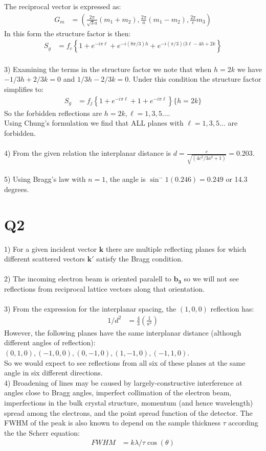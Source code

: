 \documentclass[a4paper,11pt]{article}
\numberwithin{equation}{section}
\newcommand{\bv}[1]{\mathbf{#1}}
\newcommand{\lrp}[1]{\left({#1}\right)}
\newcommand{\lrb}[1]{\left\{{#1}\right\}}
\begin{document}
The reciprocal vector is expressed as:
\begin{align}
 G_m &= \lrp{\frac{2\pi}{\sqrt{3}a}(m_1+m_2),\frac{2\pi}{a}(m_1-m_2), \frac{2\pi}{c}m_3}
\end{align}
In this form the structure factor is then:
\begin{align}
 S_g &= f_c\lrb{ 1 + e^{-i\pi\ell}+e^{-i(8\pi/3)h}+e^{-i(\pi/3)(3\ell-4h+2k} }
\end{align}
\\
3) Examining the terms in the structure factor we note that when $h=2k$ we have $-1/3h+2/3k=0$ and $1/3h-2/3k=0$.
Under this condition the structure factor simplifies to:
\begin{align}
 S_g &= f_j\lrb{ 1 + e^{-i\pi\ell}+1+e^{-i\pi\ell} }\{h=2k\}
\end{align}
So the forbidden reflections are $h=2k,\ell=1,3,5...$.
\\
Using Chung's formulation we find that ALL planes with $\ell=1,3,5...$ are forbidden.
\\ \\
4) From the given relation the interplanar distance is $d=\frac{c}{\sqrt{\lrp{4c^2/3a^2+1}}}=0.203$.
\\ \\
5) Using Bragg's law with $n=1$, the angle is $\sin^-1{(0.246)}=0.249$ or 14.3 degrees.
\section*{Q2}
1) For a given incident vector $\bv{k}$ there are multiple reflecting planes for which different scattered vectors $\bv{k'}$ satisfy the Bragg condition.
\\ \\
2) The incoming electron beam is oriented paralell to $\bv{b_3}$ so we will not see reflections from reciprocal lattice vectors along that orientation.
\\ \\
3) From the expression for the interplanar spacing, the $(1,0,0)$ reflection has:
\begin{align}
 1/d^2 &= \frac{4}{3}\lrp{\frac{1}{a^2}}
\end{align}
However, the following planes have the same interplanar distance (although different angles of reflection):\\
$(0,1,0),(-1,0,0),(0,-1,0),(1,-1,0),(-1,1,0)$.\\
So we would expect to see reflections from all six of these planes at the same angle in six different directions.
\\
4) Broadening of lines may be caused by largely-constructive interference at angles close to Bragg angles, imperfect collimation of the electron beam, imperfections in the bulk crystal structure, momentum (and hence wavelength) spread among the electrons, and the point spread function of the detector.
The FWHM of the peak is also known to depend on the sample thickness $\tau$ according the the Scherr equation:
\begin{align}
 FWHM &= k\lambda/\tau \cos{(\theta)}
\end{align}
\end{document}
